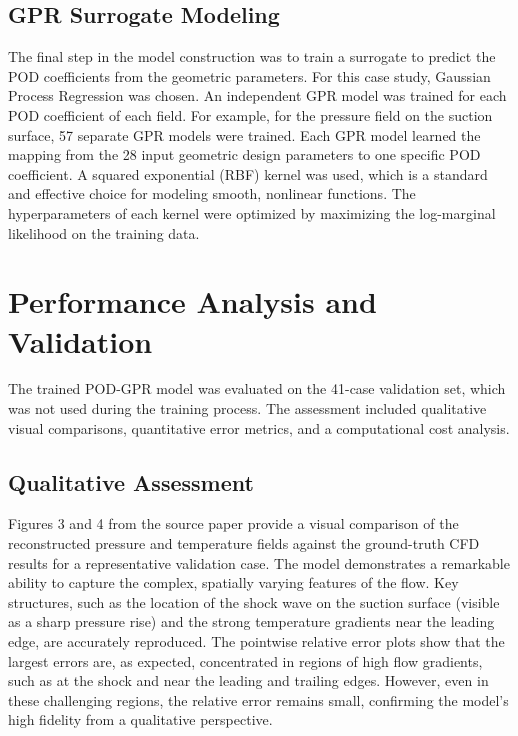 \documentclass[dsc, EN]{ufabcFHZh}
\begin{document}
\subsection{GPR Surrogate Modeling}

The final step in the model construction was to train a surrogate to predict the POD coefficients from the geometric parameters. For this case study, Gaussian Process Regression was chosen. An independent GPR model was trained for each POD coefficient of each field. For example, for the pressure field on the suction surface, 57 separate GPR models were trained. Each GPR model learned the mapping from the 28 input geometric design parameters to one specific POD coefficient. A squared exponential (RBF) kernel was used, which is a standard and effective choice for modeling smooth, nonlinear functions. The hyperparameters of each kernel were optimized by maximizing the log-marginal likelihood on the training data.  

\section{Performance Analysis and Validation}

The trained POD-GPR model was evaluated on the 41-case validation set, which was not used during the training process. The assessment included qualitative visual comparisons, quantitative error metrics, and a computational cost analysis.


\subsection{Qualitative Assessment}

Figures 3 and 4 from the source paper  provide a visual comparison of the reconstructed pressure and temperature fields against the ground-truth CFD results for a representative validation case. The model demonstrates a remarkable ability to capture the complex, spatially varying features of the flow. Key structures, such as the location of the shock wave on the suction surface (visible as a sharp pressure rise) and the strong temperature gradients near the leading edge, are accurately reproduced. The pointwise relative error plots show that the largest errors are, as expected, concentrated in regions of high flow gradients, such as at the shock and near the leading and trailing edges. However, even in these challenging regions, the relative error remains small, confirming the model's high fidelity from a qualitative perspective. 
\end{document}
